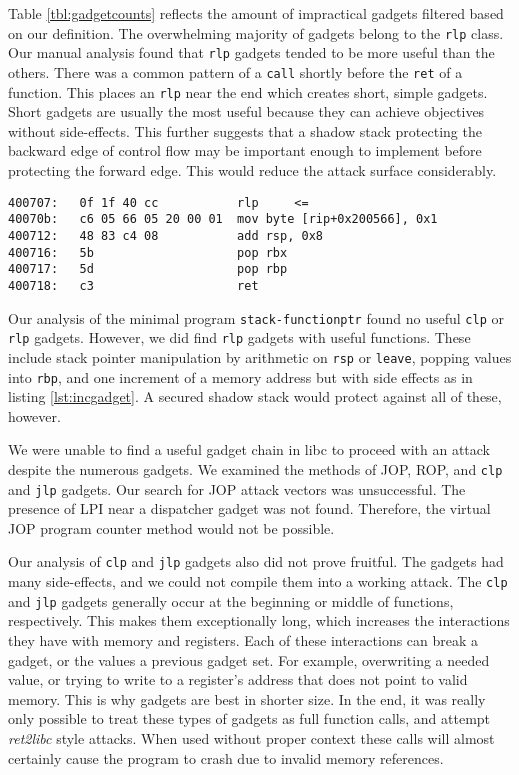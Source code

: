 \documentclass[conference,compsoc]{IEEEtran}
\begin{document}
Table \ref{tbl:gadgetcounts} reflects the amount of impractical gadgets filtered based on our definition. The overwhelming majority of gadgets belong to the \texttt{rlp} class. Our manual analysis found that \texttt{rlp} gadgets tended to be more useful than the others. There was a common pattern of a \texttt{call} shortly before the \texttt{ret} of a function. This places an \texttt{rlp} near the end which creates short, simple gadgets. Short gadgets are usually the most useful\cite{Shacham:2007,homescu2012microgadgets} because they can achieve objectives without side-effects. This further suggests that a shadow stack protecting the backward edge of control flow may be important enough to implement before protecting the forward edge. This would reduce the attack surface considerably.

\begin{lstlisting}[caption={Example Difficult rlp gadget}, label={lst:incgadget}]
400707:   0f 1f 40 cc           rlp     <=
40070b:   c6 05 66 05 20 00 01	mov byte [rip+0x200566], 0x1
400712:   48 83 c4 08        	add rsp, 0x8
400716:   5b                  	pop rbx
400717:   5d                  	pop rbp
400718:   c3                  	ret
\end{lstlisting}

Our analysis of the minimal program \texttt{stack-functionptr}\cite{NSAGitHub} found no useful \texttt{clp} or \texttt{rlp} gadgets. However, we did find \texttt{rlp} gadgets with useful functions. These include stack pointer manipulation by arithmetic on \texttt{rsp} or \texttt{leave}, popping values into \texttt{rbp}, and one increment of a memory address but with side effects as in listing \ref{lst:incgadget}. A secured shadow stack would protect against all of these, however.

We were unable to find a useful gadget chain in libc to proceed with an attack despite the numerous gadgets. We examined the methods of JOP, ROP, and \texttt{clp} and \texttt{jlp} gadgets. Our search for JOP attack vectors was unsuccessful. The presence of LPI near a dispatcher gadget was not found\cite{bletsch2011jump}. Therefore, the virtual JOP program counter method would not be possible.

Our analysis of \texttt{clp} and \texttt{jlp} gadgets also did not prove fruitful. The gadgets had many side-effects, and we could not compile them into a working attack. The \texttt{clp} and \texttt{jlp} gadgets generally occur at the beginning or middle of functions, respectively. This makes them exceptionally long, which increases the interactions they have with memory and registers. Each of these interactions can break a gadget, or the values a previous gadget set. For example, overwriting a needed value, or trying to write to a register's address that does not point to valid memory. This is why gadgets are best in shorter size\cite{Shacham:2007,homescu2012microgadgets}. In the end, it was really only possible to treat these types of gadgets as full function calls, and attempt \emph{ret2libc} style attacks. When used without proper context these calls will almost certainly cause the program to crash due to invalid memory references.
\end{document}
